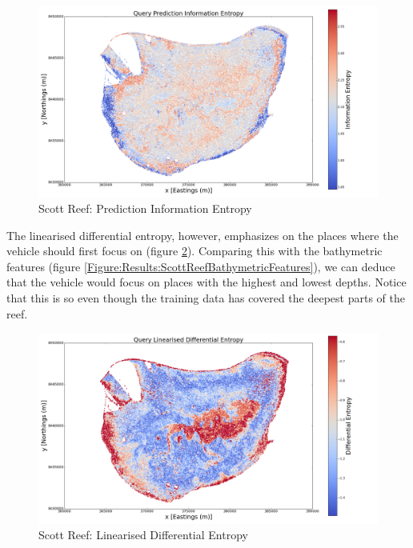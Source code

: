 \documentclass{article}
\begin{document}
			\begin{figure}[!htbp]
			\centering
				\includegraphics[width = \linewidth]{Figures/scott_reef_modeling/Figure9.png}
			\caption{Scott Reef: Prediction Information Entropy}
			\label{Figure:Results:ScottReefPredictionInformationEntropy}
			\end{figure}
						
			The linearised differential entropy, however, emphasizes on the places where the vehicle should first focus on (figure \ref{Figure:Results:ScottReefLinearisedDifferentialEntropy}). Comparing this with the bathymetric features (figure \ref{Figure:Results:ScottReefBathymetricFeatures}), we can deduce that the vehicle would focus on places with the highest and lowest depths. Notice that this is so even though the training data has covered the deepest parts of the reef.
			
			\begin{figure}[!htbp]
			\centering
				\includegraphics[width = \linewidth]{Figures/scott_reef_modeling/Figure11.png}
			\caption{Scott Reef: Linearised Differential Entropy}
			\label{Figure:Results:ScottReefLinearisedDifferentialEntropy}
			\end{figure}
		
\end{document}
